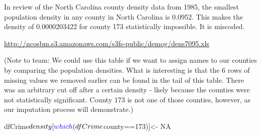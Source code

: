 \documentclass[]{article}
\newenvironment{Shaded}{}{}
\newcommand{\CommentTok}[1]{\textcolor[rgb]{0.00,0.50,0.00}{#1}}
\newcommand{\DataTypeTok}[1]{#1}
\newcommand{\DecValTok}[1]{#1}
\newcommand{\KeywordTok}[1]{\textcolor[rgb]{0.00,0.00,1.00}{#1}}
\newcommand{\NormalTok}[1]{#1}
\newcommand{\OperatorTok}[1]{#1}
\newcommand{\OtherTok}[1]{\textcolor[rgb]{1.00,0.25,0.00}{#1}}
\newcommand{\StringTok}[1]{\textcolor[rgb]{0.00,0.50,0.50}{#1}}
\begin{document}
In review of the North Carolina county density data from 1985, the
smallest population density in any county in North Carolina is 0.0952.
This makes the density of 0.0000203422 for county 173 statistically
impossible. It is miscoded.

\url{http://ncosbm.s3.amazonaws.com/s3fs-public/demog/dens7095.xls}

(Note to team: We could use this table if we want to assign names to our
counties by comparing the population densities. What is interesting is
that the 6 rows of missing values we removed earlier can be found in the
tail of this table. There was an arbitrary cut off after a certain
density - lkely because the counties were not statistically significant.
County 173 is not one of those counties, however, as our imputation
process will demonstrate.)

\begin{Shaded}
\begin{Highlighting}[]
\NormalTok{dfCrime}\OperatorTok{$}\NormalTok{density[}\KeywordTok{which}\NormalTok{(dfCrime}\OperatorTok{$}\NormalTok{county}\OperatorTok{==}\DecValTok{173}\NormalTok{)]<-}\StringTok{ }\OtherTok{NA}
\end{Highlighting}
\end{Shaded}

\begin{Shaded}
\end{Shaded}
\end{document}
